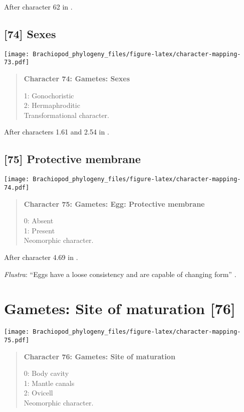 \documentclass[openany]{book}
\theoremstyle{definition}
\theoremstyle{definition}
\theoremstyle{definition}
\theoremstyle{remark}
\begin{document}
After character 62 in \citet{Haszprunar2000}.

\subsection*{{[}74{]} Sexes}\label{sexes}

\texttt{[image: Brachiopod\_phylogeny\_files/figure-latex/character-mapping-73.pdf]}

\begin{quote}
\textbf{Character 74: Gametes: Sexes}

1: Gonochoristic\\
2: Hermaphroditic\\
Transformational character.
\end{quote}

After characters 1.61 and 2.54 in \citet{SPS1996}.

\subsection*{{[}75{]} Protective membrane}\label{protective-membrane}

\texttt{[image: Brachiopod\_phylogeny\_files/figure-latex/character-mapping-74.pdf]}

\begin{quote}
\textbf{Character 75: Gametes: Egg: Protective membrane}

0: Absent\\
1: Present\\
Neomorphic character.
\end{quote}

After character 4.69 in \citet{SPS1996}.

\hypertarget{Flustra-coding-75}{}
\emph{Flustra}: ``Eggs have a loose consistency and are capable of
changing form'' \citep{Franzen2013}.

\section{Gametes: Site of maturation
{[}76{]}}\label{gametes-site-of-maturation-76}

\texttt{[image: Brachiopod\_phylogeny\_files/figure-latex/character-mapping-75.pdf]}

\begin{quote}
\textbf{Character 76: Gametes: Site of maturation}

0: Body cavity\\
1: Mantle canals\\
2: Ovicell\\
Neomorphic character.
\end{quote}
\end{document}
